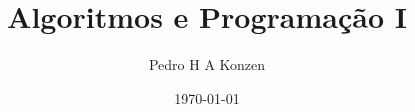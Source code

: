 \documentclass[12pt]{book}
\begin{document}
\frontmatter

\title{Algoritmos e Programação I}
\author{Pedro H A Konzen}
\date{\today}
\ifishtml
\else
{}
\fi

\maketitle

\nocite{Banin2021a,
  Cormen2021a,
  Cormen2012a,
  Grus2021a,
  Ribeiro2021a,
  Wazlawick2021a}




\tableofcontents
{}

\mainmatter





\ifisbook

\fi

\nocite{*}


\ifisbook
\clearpage
{}
\printindex
\fi
\end{document}
